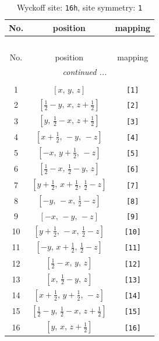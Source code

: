 \documentclass[fleqn,8pt]{jsarticle}
\begin{document}
\begin{longtable}{ccc}
\caption{Wyckoff site: {\tt 16h}, site symmetry: {\tt 1}}
 \\
 \hline \hline
No. & position & mapping \\ \hline \endfirsthead

\multicolumn{2}{l}{\tablename\ \thetable{}} \\
 \hline \hline
No. & position & mapping \\ \hline \endhead

 \hline \hline
\multicolumn{2}{r}{\footnotesize\it continued ...} \\ \endfoot

 \hline \hline
\multicolumn{2}{r}{} \\ \endlastfoot

1 & $\left[ x,\, y,\, z \right]$ & {\tt [1]} \\ \hline
2 & $\left[ \frac{1}{2} - y,\, x,\, z + \frac{1}{2} \right]$ & {\tt [2]} \\ \hline
3 & $\left[ y,\, \frac{1}{2} - x,\, z + \frac{1}{2} \right]$ & {\tt [3]} \\ \hline
4 & $\left[ x + \frac{1}{2},\, - y,\, - z \right]$ & {\tt [4]} \\ \hline
5 & $\left[ - x,\, y + \frac{1}{2},\, - z \right]$ & {\tt [5]} \\ \hline
6 & $\left[ \frac{1}{2} - x,\, \frac{1}{2} - y,\, z \right]$ & {\tt [6]} \\ \hline
7 & $\left[ y + \frac{1}{2},\, x + \frac{1}{2},\, \frac{1}{2} - z \right]$ & {\tt [7]} \\ \hline
8 & $\left[ - y,\, - x,\, \frac{1}{2} - z \right]$ & {\tt [8]} \\ \hline
9 & $\left[ - x,\, - y,\, - z \right]$ & {\tt [9]} \\ \hline
10 & $\left[ y + \frac{1}{2},\, - x,\, \frac{1}{2} - z \right]$ & {\tt [10]} \\ \hline
11 & $\left[ - y,\, x + \frac{1}{2},\, \frac{1}{2} - z \right]$ & {\tt [11]} \\ \hline
12 & $\left[ \frac{1}{2} - x,\, y,\, z \right]$ & {\tt [12]} \\ \hline
13 & $\left[ x,\, \frac{1}{2} - y,\, z \right]$ & {\tt [13]} \\ \hline
14 & $\left[ x + \frac{1}{2},\, y + \frac{1}{2},\, - z \right]$ & {\tt [14]} \\ \hline
15 & $\left[ \frac{1}{2} - y,\, \frac{1}{2} - x,\, z + \frac{1}{2} \right]$ & {\tt [15]} \\ \hline
16 & $\left[ y,\, x,\, z + \frac{1}{2} \right]$ & {\tt [16]} \\
\end{longtable}
\end{document}
